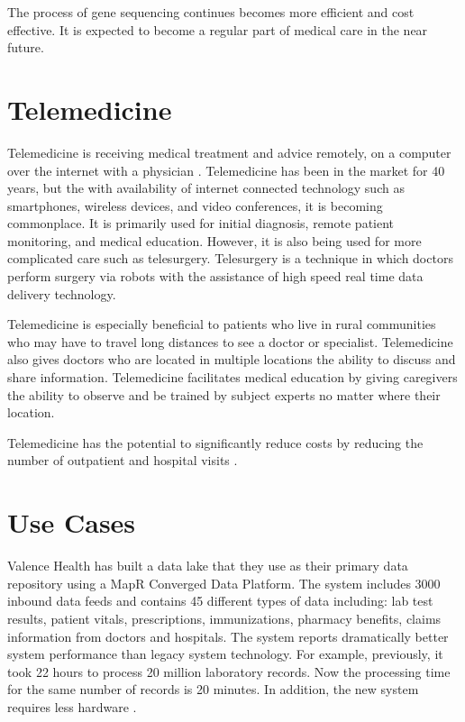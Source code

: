 \documentclass[sigconf]{acmart}
\begin{document}
The process of gene sequencing continues becomes more efficient and cost effective.  It is expected to become a regular part of medical care in the near future.
 

\section{Telemedicine}

Telemedicine is receiving medical treatment and advice remotely, on a computer over the internet with a physician \cite{www-forbes-042015}.  Telemedicine has been in the market for 40 years, but the with availability of internet connected technology such as smartphones, wireless devices, and video conferences, it is becoming commonplace.  It is primarily used for initial diagnosis, remote patient monitoring, and medical education.  However, it is also being used for more complicated care such as telesurgery. Telesurgery is a technique in which doctors perform surgery via robots with the assistance of high speed real time data delivery technology.

Telemedicine is especially beneficial to patients who live in rural communities who may have to travel long distances to see a doctor or specialist.  Telemedicine also gives doctors who are located in multiple locations the ability to discuss and share information. Telemedicine facilitates medical education by giving caregivers the ability to observe and be trained by subject experts no matter where their location.

Telemedicine has the potential to significantly reduce costs by reducing the number of outpatient and hospital visits \cite{www-google-wikitele}.

 \section{Use Cases}
 
Valence Health has built a data lake that they use as their primary data repository using a MapR Converged Data Platform. The system includes 3000 inbound data feeds and contains 45 different types of data including:  lab test results, patient vitals, prescriptions, immunizations, pharmacy benefits, claims information from doctors and hospitals. The system reports dramatically better system performance than legacy system technology. For example, previously, it took 22 hours to process 20 million laboratory records. Now the processing time for the same number of records is 20 minutes. In addition, the new system requires less hardware \cite{www-google-McDonald}. 
\end{document}
